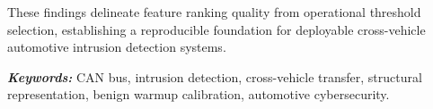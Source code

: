 \documentclass[12pt, a4paper, reqno, oneside]{book}
\renewcommand{\baselinestretch}{1.25}
\begin{document}
These findings delineate feature ranking quality from operational threshold selection, establishing a reproducible foundation for deployable cross-vehicle automotive intrusion detection systems.

\vspace{0.2em}
\noindent \textit{\textbf{Keywords:}} CAN bus, intrusion detection, cross-vehicle transfer, structural representation, benign warmup calibration, automotive cybersecurity.

\newpage

\begingroup
\small
\renewcommand{\baselinestretch}{0.95}\selectfont
\setlength{\parskip}{0pt}
\makeatletter
\renewcommand*\l@chapter[2]{%
  \ifnum \c@tocdepth >\m@ne
    \addpenalty{-\@highpenalty}%
    \vskip 0.25em \@plus\p@
    \setlength\@tempdima{1.5em}%
    \begingroup
      \parindent \z@ \rightskip \@pnumwidth
      \parfillskip -\@pnumwidth
      \leavevmode \bfseries
      \advance\leftskip\@tempdima
      \hskip -\leftskip
      #1\nobreak\hfil \nobreak\hb@xt@\@pnumwidth{\hss #2}\par
      \penalty\@highpenalty
    \endgroup
  \fi}
\makeatother
\tableofcontents
\endgroup
\clearpage

\clearpage
\begingroup
\small
\setlength{\parskip}{0pt}
{}
\listoffigures
\endgroup
\clearpage

\begingroup
\small
\setlength{\parskip}{0pt}
{}
\listoftables
\endgroup
\clearpage

\begingroup
\small
\setlength{\parskip}{0pt}
{}
\listofalgorithms
\endgroup
\clearpage
\end{document}
